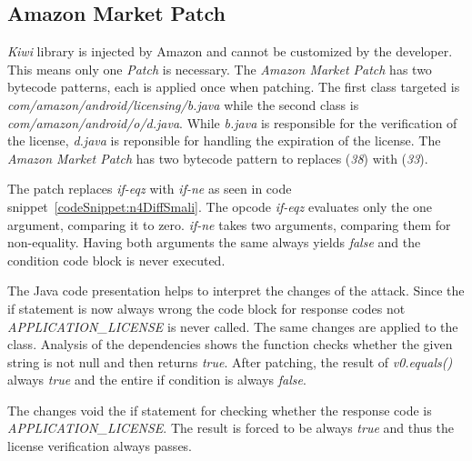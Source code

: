 \subsection{Amazon Market Patch}
\textit{Kiwi} library is injected by Amazon and cannot be customized by the developer.
This means only one \textit{Patch} is necessary.
The \textit{Amazon Market Patch} has two bytecode patterns, each is applied once when patching.
The first class targeted is \textit{com/amazon/android/licensing/b.java} while the second class is \textit{com/amazon/android/o/d.java}.
While \textit{b.java} is responsible for the verification of the license, \textit{d.java} is reponsible for handling the expiration of the license.
\newline
The \textit{Amazon Market Patch} has two bytecode pattern to replaces (\textit{38}) with (\textit{33}).
\newline

The patch replaces \textit{if-eqz} with \textit{if-ne} as seen in code snippet~\ref{codeSnippet:n4DiffSmali}.
The opcode \textit{if-eqz} evaluates only the one argument, comparing it to zero.
\textit{if-ne} takes two arguments, comparing them for non-equality.
Having both arguments the same always yields \textit{false} and the condition code block is never executed.

The Java code presentation helps to interpret the changes of the attack.
Since the if statement is now always wrong the code block for response codes not \textit{APPLICATION\_LICENSE} is never called.
The same changes are applied to the  class.
Analysis of the dependencies shows the function checks whether the given string is not null and then returns \textit{true}.
After patching, the result of \textit{v0.equals()} always \textit{true} and the entire if condition is always \textit{false}.
\newline

The changes void the if statement for checking whether the response code is \textit{APPLICATION\_LICENSE}.
The result is forced to be always \textit{true} and thus the license verification always passes.

